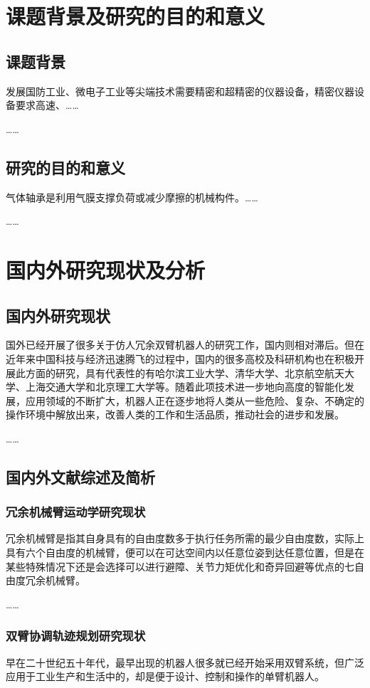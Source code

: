 \section{课题背景及研究的目的和意义}
\subsection{课题背景}
发展国防工业、微电子工业等尖端技术需要精密和超精密的仪器设备，精密仪器设备要求高速、……

……

\subsection{研究的目的和意义}
气体轴承是利用气膜支撑负荷或减少摩擦的机械构件。……

……

\section{国内外研究现状及分析}
\subsection{国内外研究现状}
国外已经开展了很多关于仿人冗余双臂机器人的研究工作，国内则相对滞后。但在近年来中国科技与经济迅速腾飞的过程中，国内的很多高校及科研机构也在积极开展此方面的研究，具有代表性的有哈尔滨工业大学、清华大学、北京航空航天大学、上海交通大学和北京理工大学等。随着此项技术进一步地向高度的智能化发展，应用领域的不断扩大，机器人正在逐步地将人类从一些危险、复杂、不确定的操作环境中解放出来，改善人类的工作和生活品质，推动社会的进步和发展。

……

\subsection{国内外文献综述及简析}
\subsubsection{冗余机械臂运动学研究现状}
冗余机械臂是指其自身具有的自由度数多于执行任务所需的最少自由度数，实际上具有六个自由度的机械臂，便可以在可达空间内以任意位姿到达任意位置，但是在某些特殊情况下还是会选择可以进行避障、关节力矩优化和奇异回避等优点的七自由度冗余机械臂。

……

\subsubsection{双臂协调轨迹规划研究现状}
早在二十世纪五十年代，最早出现的机器人很多就已经开始采用双臂系统，但广泛应用于工业生产和生活中的，却是便于设计、控制和操作的单臂机器人。

